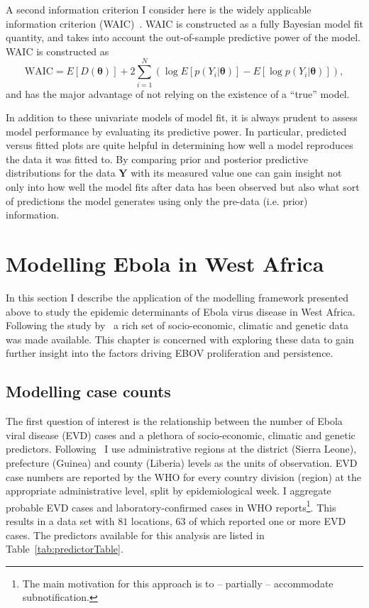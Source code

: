 A second information criterion I consider here is the  widely applicable information criterion (WAIC)~\citep{Watanabe2010}.
WAIC is constructed as a fully Bayesian model fit quantity, and takes into account the out-of-sample predictive power of the model.
WAIC is constructed as 
\[  \text{WAIC} = E[D(\boldsymbol\theta)] + 2\sum_{i=1}^N\left(\log E[p(Y_i | \boldsymbol \theta)] - E[\log p(Y_i | \boldsymbol \theta)] \right),\]
and has the major advantage of not relying on the existence of a ``true'' model.

In addition  to these univariate models of model fit, it is always prudent to assess model performance by evaluating its predictive power.
In particular, predicted versus fitted plots are quite helpful in determining how well a model reproduces the data it was fitted to.
By comparing prior and posterior predictive distributions for the data $\boldsymbol Y$ with its measured value one can gain insight not only into how well the model fits after data has been observed but also what sort of predictions the model generates using only the pre-data (i.e. prior) information.

\section{Modelling Ebola in West Africa}

In this section I describe the application of the modelling framework presented above to study the epidemic determinants of Ebola virus disease in West Africa.
Following the study by~\cite{Dudas2017} a rich set of socio-economic, climatic and genetic data was made available.
This chapter is concerned with exploring these data to gain further insight into the factors driving EBOV proliferation and persistence.

\subsection{Modelling case counts}

The first question of interest is the relationship between the number of Ebola viral disease (EVD) cases and a plethora of socio-economic, climatic and genetic predictors.
Following~\cite{Dudas2017} I use administrative regions at the district (Sierra Leone), prefecture (Guinea) and county (Liberia) levels as the units of observation.
EVD case numbers are reported by the WHO for every country division (region) at the appropriate administrative level, split by epidemiological week.
I aggregate probable EVD cases and laboratory-confirmed cases in WHO reports\footnote{The main motivation for this approach is to -- partially -- accommodate subnotification.}.
This results in a data set with $81$ locations, $63$ of which reported one or more EVD cases.
The predictors available for this analysis are listed in Table~\ref{tab:predictorTable}.

